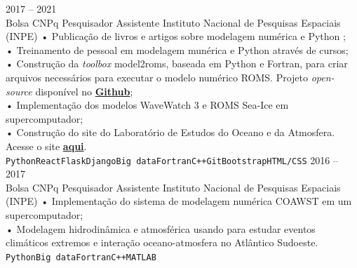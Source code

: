 \documentclass[9pt]{developercv} %
\begin{document}
\begin{entrylist}
	\entry
		{2017 -- 2021\\\footnotesize{Bolsa CNPq}}
		{Pesquisador Assistente}
		{Instituto Nacional de Pesquisas Espaciais (INPE)}
		{• Publicação de livros e artigos sobre modelagem numérica e Python ; \\
		• Treinamento de pessoal em modelagem munérica e Python através de cursos; \\
		• Construção da \textit{toolbox} model2roms, baseada em Python e Fortran,  para criar arquivos necessários para executar o modelo numérico ROMS.  Projeto \textit{open-source} disponível no \href{https://github.com/uesleisutil/model2roms}{\textcolor{bleu_cite}{\textbf{Github}}}; \\	
		• Implementação dos modelos WaveWatch 3 e ROMS Sea-Ice em supercomputador;\\
		• Construção do site do Laboratório de Estudos do Oceano e da Atmosfera. Acesse o site \href{https://loa-inpe.github.io/}{\textcolor{bleu_cite}{\textbf{aqui}}}. \\
		\texttt{Python}\slashsep\texttt{React}\slashsep\texttt{Flask}\slashsep\texttt{Django}\slashsep\texttt{Big data}\slashsep\texttt{Fortran}\slashsep\texttt{C++}\slashsep\texttt{Git}\slashsep\texttt{Bootstrap}\slashsep\texttt{HTML/CSS}}
	\entry
		{2016 -- 2017\\\footnotesize{Bolsa CNPq}}
		{Pesquisador Assistente}
		{Instituto Nacional de Pesquisas Espaciais (INPE)}
		{•  Implementação do sistema de modelagem numérica COAWST em um supercomputador; \\
		 • Modelagem hidrodinâmica e atmosférica usando para estudar eventos climáticos extremos e interação oceano-atmosfera no Atlântico Sudoeste. 
		 \\ \texttt{Python}\slashsep\texttt{Big data}\slashsep\texttt{Fortran}\slashsep\texttt{C++}\slashsep\texttt{MATLAB}}
\end{entrylist}

\vspace{-0.5cm}
\end{document}
